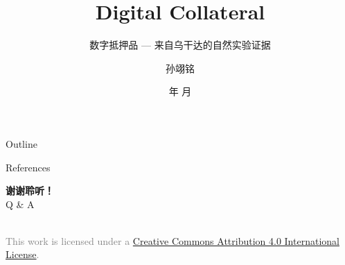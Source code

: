 \documentclass[aspectratio=169]{beamer}
\title{Digital Collateral}
\subtitle{数字抵押品 --- 来自乌干达的自然实验证据}
\author[孙翊铭]{孙翊铭}
\institute[吉林大学]{经济学院金融系, 吉林大学 \\ \texttt{sunym25@mails.jlu.edu.cn}}
\date{\number\year 年 \number\month 月}
\begin{document}
\begin{frame}
  \titlepage
\end{frame}

\begin{frame}{Outline}
    \tableofcontents
\end{frame}






%

%

\begin{frame}[allowframebreaks]{References}
  \tiny
  \printbibliography
\end{frame}

\begin{frame}
  \vspace*{\fill}
  \begin{center}
    {\Huge \textbf{谢谢聆听！}} \\[1em]
    {\large Q \& A}
  \end{center}
  \vspace*{\fill}
  
  \begin{center}
    \tiny \textcolor{gray}{
      \ccby \\ %
      This work is licensed under a \href{https://creativecommons.org/licenses/by/4.0/}{Creative Commons Attribution 4.0 International License}.
    }
  \end{center}
\end{frame}
\end{document}
